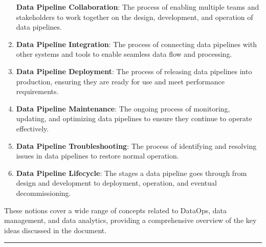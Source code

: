 \documentclass[
  letterpaper,
  DIV=11,
  numbers=noendperiod]{scrartcl}
\begin{document}
\begin{enumerate}
  \textbf{Data Pipeline Collaboration}: The process of enabling multiple
  teams and stakeholders to work together on the design, development,
  and operation of data pipelines.
\item
  \textbf{Data Pipeline Integration}: The process of connecting data
  pipelines with other systems and tools to enable seamless data flow
  and processing.
\item
  \textbf{Data Pipeline Deployment}: The process of releasing data
  pipelines into production, ensuring they are ready for use and meet
  performance requirements.
\item
  \textbf{Data Pipeline Maintenance}: The ongoing process of monitoring,
  updating, and optimizing data pipelines to ensure they continue to
  operate effectively.
\item
  \textbf{Data Pipeline Troubleshooting}: The process of identifying and
  resolving issues in data pipelines to restore normal operation.
\item
  \textbf{Data Pipeline Lifecycle}: The stages a data pipeline goes
  through from design and development to deployment, operation, and
  eventual decommissioning.
\end{enumerate}

These notions cover a wide range of concepts related to DataOps, data
management, and data analytics, providing a comprehensive overview of
the key ideas discussed in the document.

\begin{center}\rule{0.5\linewidth}{0.5pt}\end{center}
\end{document}
